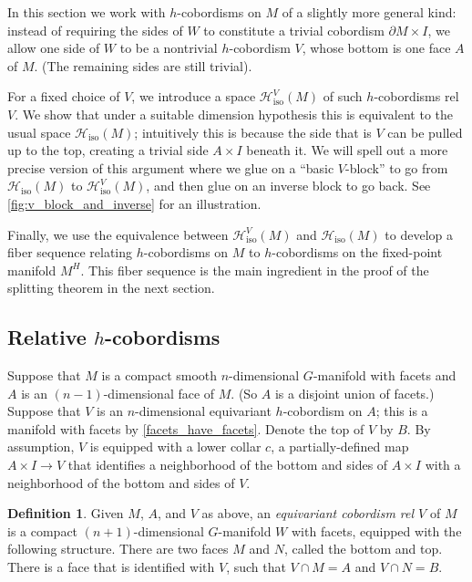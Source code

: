 \documentclass[11pt]{amsart}
\theoremstyle{definition}
\newtheorem{defn}{Definition}[section]
\numberwithin{equation}{section}
\numberwithin{figure}{section}
\newcommand{\mc}{\mathcal}
\newcommand{\iso}{\mathrm{iso}}
\newcommand{\ourdefn}[1]{{\it #1}}
\begin{document}
In this section we work with $h$-cobordisms on $M$ of a slightly more general kind: instead of requiring the sides of $W$ to constitute a trivial cobordism $\partial M \times I$, we allow one side of $W$ to be a nontrivial $h$-cobordism $V$, whose bottom is one face $A$ of $M$. (The remaining sides are still trivial).

For a fixed choice of $V$, we introduce a space $\mc H_{\iso}^{V}(M)$ of such $h$-cobordisms rel $V$. We show that under a suitable dimension hypothesis this is equivalent to the usual space $\mc H_\iso(M)$; intuitively this is because the side that is $V$ can be pulled up to the top, creating a trivial side $A \times I$ beneath it. We will spell out a more precise version of this argument where we glue on a ``basic $V$-block'' to go from $\mc H_\iso(M)$ to $\mc H_{\iso}^{V}(M)$, and then glue on an inverse block to go back. See \autoref{fig:v_block_and_inverse} for an illustration.

Finally, we use the equivalence between $\mc H_{\iso}^{V}(M)$ and $\mc H_\iso(M)$ to develop a fiber sequence relating $h$-cobordisms on $M$ to $h$-cobordisms on the fixed-point manifold $M^H$. This fiber sequence is the main ingredient in the proof of the splitting theorem in the next section.




\subsection{Relative $h$-cobordisms}\label{isovhcobrel}

Suppose that $M$ is a compact smooth $n$-dimensional $G$-manifold with facets and $A$ is an $(n-1)$-dimensional face of $M$. (So $A$ is a disjoint union of facets.) Suppose that $V$ is an $n$-dimensional equivariant $h$-cobordism on $A$; this is a manifold with facets by \autoref{facets_have_facets}. Denote the top of $V$ by $B$. By assumption, $V$ is equipped with a lower collar $c$, a partially-defined map $A \times I \to V$ that identifies a neighborhood of the bottom and sides of $A \times I$ with a neighborhood of the bottom and sides of $V$.

\begin{defn}
Given $M$, $A$, and $V$ as above, an \ourdefn{equivariant cobordism rel $V$} of $M$ is a compact $(n+1)$-dimensional $G$-manifold $W$ with facets, equipped with the following structure. There are two faces $M$ and $N$, called the bottom and top. There is a face that is identified with $V$, such that $V\cap M=A$ and $V\cap N=B$.
\end{defn}
\end{document}
